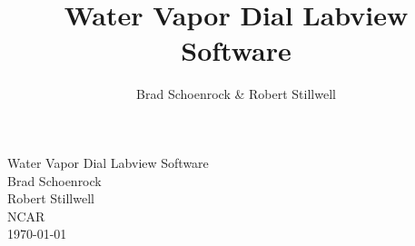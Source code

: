 \documentclass{report} %
\title{Water Vapor Dial Labview Software}
\author{Brad Schoenrock & Robert Stillwell}
\begin{document}
                    
\begin{center}
{\sc \LARGE Water Vapor Dial Labview Software} \\
\vspace{0.25in}
{\sc \Large Brad Schoenrock\\}
{\sc \Large Robert Stillwell\\}
\vspace{0.5in}
{\large NCAR
\\ \today}
\end{center}
\vspace{0.5in}
\thispagestyle{empty}

\newpage                               	%
\tableofcontents                     	%
\thispagestyle{empty}		%
\newpage      				%
\setcounter{page}{1}            	%












\end{document}
